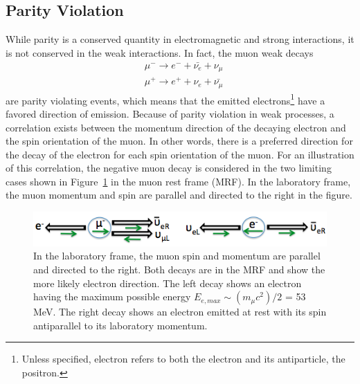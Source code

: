 \documentclass{outhesis}
\begin{document}
\subsection{Parity Violation}
\label{sec:pv}
While parity is a conserved quantity in electromagnetic and strong interactions, it is not conserved in the weak interactions. 
In fact, the muon weak decays
\begin{equation}
\begin{split}
&\mu^- \rightarrow {e^-} + \bar{\nu_e} + \nu_{\mu}\\
&\mu^+ \rightarrow {e^+} + \nu_e + \bar{\nu_{\mu}}
\label{eq:decay}
\end{split}
\end{equation}
are parity violating events, which means that the emitted electrons\footnote{Unless specified, electron refers to both the electron and its antiparticle, the positron.} have a favored direction of emission. 
Because of parity violation in weak processes, a correlation exists between the momentum direction of the decaying electron and the spin orientation of the muon. In other words, there is a preferred direction for the decay of the electron for each spin orientation of the muon. For an illustration of this correlation, the negative muon decay is considered in the two limiting cases shown in Figure~\ref{fig:muon} in the muon rest frame (MRF). In the laboratory frame, the muon momentum and spin are parallel and directed to the right in the figure. \\
 \begin{figure}
  \centering
  \includegraphics[scale=0.5]{figures/mu_decay}
  \caption{ In the laboratory frame, the muon spin and momentum are parallel and directed to the right. Both decays are in the MRF and show the more likely electron direction. The left decay shows an electron having the maximum possible energy $E_{e,max}\sim \left(m_{\mu}c^2\right)/2$ = 53 MeV. The right decay shows an electron emitted at rest with its spin antiparallel to its laboratory momentum. }
  \label{fig:muon}
\end{figure}
\end{document}
